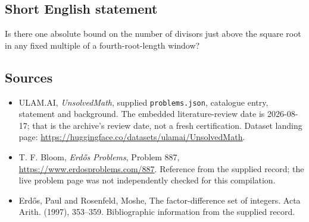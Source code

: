 \documentclass[11pt,a4paper]{article}
\begin{document}
\subsection{Short English statement}

Is there one absolute bound on the number of divisors just above the square root in any fixed multiple of a fourth-root-length window?

\subsection{Sources}

{\small

\begin{itemize}

\item[\hypertarget{source:statement:1}{S1}] ULAM.AI, \emph{UnsolvedMath}, supplied \texttt{problems.json}, catalogue entry, statement and background. The embedded literature-review date is 2026-08-17; that is the archive’s review date, not a fresh certification. Dataset landing page: \url{https://huggingface.co/datasets/ulamai/UnsolvedMath}.

\item[\hypertarget{source:statement:2}{S2}] T. F. Bloom, \emph{Erdős Problems}, Problem 887, \url{https://www.erdosproblems.com/887}. Reference from the supplied record; the live problem page was not independently checked for this compilation.

\item[\hypertarget{source:statement:3}{S3}] Erd\H{o}s, Paul and Rosenfeld, Moshe, The factor-difference set of integers. Acta Arith. (1997), 353--359. Bibliographic information from the supplied record.

\end{itemize}

}

\label{end:statement}
\end{document}

